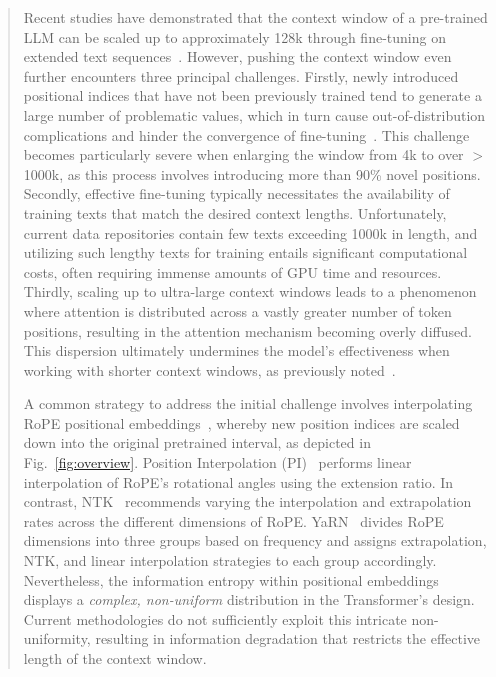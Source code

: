 \begin{abstract}
Recent studies have demonstrated that the context window of a pre-trained LLM can be scaled up to approximately 128k through fine-tuning on extended text sequences~\cite{longlora,pi,yarn,zhang2024soaring,liu2023scaling}. However, pushing the context window even further encounters three principal challenges. Firstly, newly introduced positional indices that have not been previously trained tend to generate a large number of problematic values, which in turn cause out-of-distribution complications and hinder the convergence of fine-tuning~\cite{pi}. This challenge becomes particularly severe when enlarging the window from 4k to over $>$1000k, as this process involves introducing more than 90\% novel positions. Secondly, effective fine-tuning typically necessitates the availability of training texts that match the desired context lengths. Unfortunately, current data repositories contain few texts exceeding 1000k in length, and utilizing such lengthy texts for training entails significant computational costs, often requiring immense amounts of GPU time and resources. Thirdly, scaling up to ultra-large context windows leads to a phenomenon where attention is distributed across a vastly greater number of token positions, resulting in the attention mechanism becoming overly diffused. This dispersion ultimately undermines the model’s effectiveness when working with shorter context windows, as previously noted~\cite{pi}.

A common strategy to address the initial challenge involves interpolating RoPE positional embeddings~\cite{rope,pi}, whereby new position indices are scaled down into the original pretrained interval, as depicted in Fig.~\ref{fig:overview}. Position Interpolation (PI)~\cite{pi} performs linear interpolation of RoPE’s rotational angles using the extension ratio. In contrast, NTK~\cite{ntk,dynamicntk} recommends varying the interpolation and extrapolation rates across the different dimensions of RoPE. YaRN~\cite{yarn} divides RoPE dimensions into three groups based on frequency and assigns extrapolation, NTK, and linear interpolation strategies to each group accordingly. Nevertheless, the information entropy within positional embeddings displays a \emph{complex, non-uniform} distribution in the Transformer’s design. Current methodologies do not sufficiently exploit this intricate non-uniformity, resulting in information degradation that restricts the effective length of the context window.


\end{abstract}
